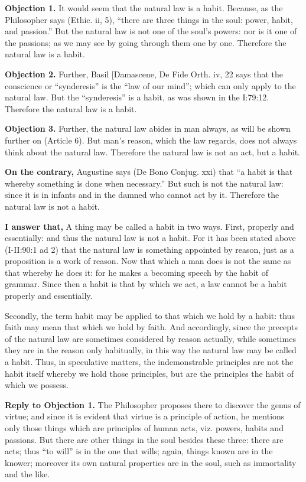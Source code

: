 
\textbf{Objection 1.} It would seem that the natural law is a habit. Because, as the Philosopher says (Ethic. ii, 5), ``there are three things in the soul: power, habit, and passion.'' But the natural law is not one of the soul's powers: nor is it one of the passions; as we may see by going through them one by one. Therefore the natural law is a habit.

\textbf{Objection 2.} Further, Basil [Damascene, De Fide Orth. iv, 22 says that the conscience or ``synderesis'' is the ``law of our mind''; which can only apply to the natural law. But the ``synderesis'' is a habit, as was shown in the I:79:12. Therefore the natural law is a habit.

\textbf{Objection 3.} Further, the natural law abides in man always, as will be shown further on (Article 6). But man's reason, which the law regards, does not always think about the natural law. Therefore the natural law is not an act, but a habit.

\textbf{On the contrary,} Augustine says (De Bono Conjug. xxi) that ``a habit is that whereby something is done when necessary.'' But such is not the natural law: since it is in infants and in the damned who cannot act by it. Therefore the natural law is not a habit.

\textbf{I answer that,} A thing may be called a habit in two ways. First, properly and essentially: and thus the natural law is not a habit. For it has been stated above (I-II:90:1 ad 2) that the natural law is something appointed by reason, just as a proposition is a work of reason. Now that which a man does is not the same as that whereby he does it: for he makes a becoming speech by the habit of grammar. Since then a habit is that by which we act, a law cannot be a habit properly and essentially.

Secondly, the term habit may be applied to that which we hold by a habit: thus faith may mean that which we hold by faith. And accordingly, since the precepts of the natural law are sometimes considered by reason actually, while sometimes they are in the reason only habitually, in this way the natural law may be called a habit. Thus, in speculative matters, the indemonstrable principles are not the habit itself whereby we hold those principles, but are the principles the habit of which we possess.

\textbf{Reply to Objection 1.} The Philosopher proposes there to discover the genus of virtue; and since it is evident that virtue is a principle of action, he mentions only those things which are principles of human acts, viz. powers, habits and passions. But there are other things in the soul besides these three: there are acts; thus ``to will'' is in the one that wills; again, things known are in the knower; moreover its own natural properties are in the soul, such as immortality and the like.

